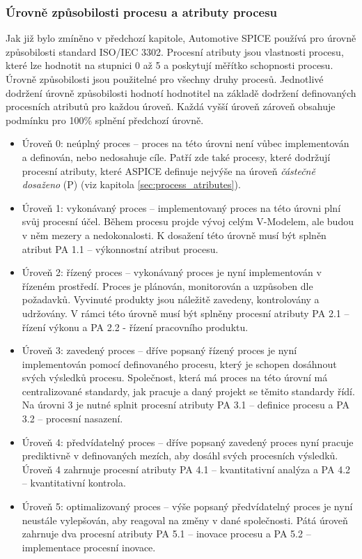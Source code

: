 \documentclass[czech,master,public,dept460,male,cpdeclaration,oneside]{diploma}
\begin{document}
\subsubsection{Úrovně způsobilosti procesu a atributy procesu}
Jak již bylo zmíněno v předchozí kapitole, Automotive SPICE používá pro úrovně způsobilosti standard ISO/IEC 3302. Procesní atributy jsou vlastnosti procesu, které lze hodnotit na stupnici 0 až 5 a poskytují měřítko schopnosti procesu. Úrovně způsobilosti jsou použitelné pro všechny druhy procesů. Jednotlivé dodržení úrovně způsobilosti hodnotí hodnotitel na základě dodržení definovaných procesních atributů pro každou úroveň. Každá vyšší úroveň zároveň obsahuje podmínku pro 100\% splnění předchozí úrovně.

\begin{itemize}
\item Úroveň 0: neúplný proces -- proces na této úrovni není vůbec implementován a definován, nebo nedosahuje cíle. Patří zde také procesy, které dodržují procesní atributy, které ASPICE definuje nejvýše na úroveň \textit{částečně dosaženo} (P) (viz kapitola \ref{sec:process_atributes}).

\item Úroveň 1: vykonávaný proces -- implementovaný proces na této úrovni plní svůj procesní účel. Během procesu projde vývoj celým V-Modelem, ale budou v něm mezery a nedokonalosti. K dosažení této úrovně musí být splněn atribut PA 1.1 -- výkonnostní atribut procesu.

\item Úroveň 2: řízený proces -- vykonávaný proces je nyní implementován v řízeném prostředí. Proces je plánován, monitorován a uzpůsoben dle požadavků. Vyvinuté produkty jsou náležitě zavedeny, kontrolovány a udržovány. V rámci této úrovně musí být splněny procesní atributy PA 2.1 -- řízení výkonu a PA 2.2 - řízení pracovního produktu.

\item Úroveň 3: zavedený proces -- dříve popsaný řízený proces je nyní implementován pomocí definovaného procesu, který je schopen dosáhnout svých výsledků procesu. Společnost, která má proces na této úrovní má centralizované standardy, jak pracuje a daný projekt se těmito standardy řídí. Na úrovni 3 je nutné splnit procesní atributy PA 3.1 -- definice procesu a PA 3.2 -- procesní nasazení.

\item Úroveň 4: předvídatelný proces -- dříve popsaný zavedený proces nyní pracuje prediktivně v definovaných mezích, aby dosáhl svých procesních výsledků. Úroveň 4 zahrnuje procesní atributy PA 4.1 -- kvantitativní analýza a PA 4.2 -- kvantitativní kontrola.

\item Úroveň 5: optimalizovaný proces -- výše popsaný předvídatelný proces je nyní neustále vylepšován, aby reagoval na změny v dané společnosti. Pátá úroveň zahrnuje dva procesní atributy PA 5.1 -- inovace procesu a PA 5.2 -- implementace procesní inovace.

\end{itemize}
\end{document}
